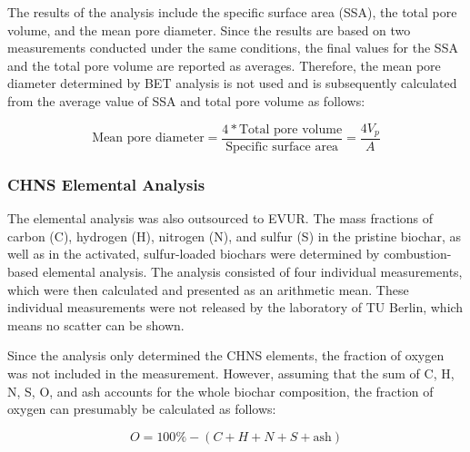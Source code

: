 \vspace{0.3em}

The results of the analysis include the specific surface area (SSA), the total pore volume, and the mean pore diameter. Since the results are based on two measurements conducted under the same conditions, the final values for the SSA and the total pore volume are reported as averages. Therefore, the mean pore diameter determined by BET analysis is not used and is subsequently calculated from the average value of SSA and total pore volume as follows:

\begin{equation}
\text{Mean pore diameter} = \frac{4 *\text{Total pore volume}}{\text{Specific surface area}} =\frac{4V_p}{A}
\label{Equation mean pore}
\end{equation}


\subsubsection{CHNS Elemental Analysis}
\label{subsubsec:methods-chns}
The elemental analysis was also outsourced to EVUR. The mass fractions of carbon (C), hydrogen (H), nitrogen (N), and sulfur (S) in the pristine biochar, as well as in the activated, sulfur-loaded biochars were determined by combustion-based elemental analysis. The analysis consisted of four individual measurements, which were then calculated and presented as an arithmetic mean. These individual measurements were not released by the laboratory of TU Berlin, which means no scatter can be shown.

\vspace{0.3em}

Since the analysis only determined the CHNS elements, the fraction of oxygen was not included in the measurement. However, assuming that the sum of C, H, N, S, O, and ash accounts for the whole biochar composition, the fraction of oxygen can presumably be calculated as follows:  

\begin{equation}
O = 100\% - (C + H + N + S + \mathrm{ash})
\label{eq:O_fraction}
\end{equation}



